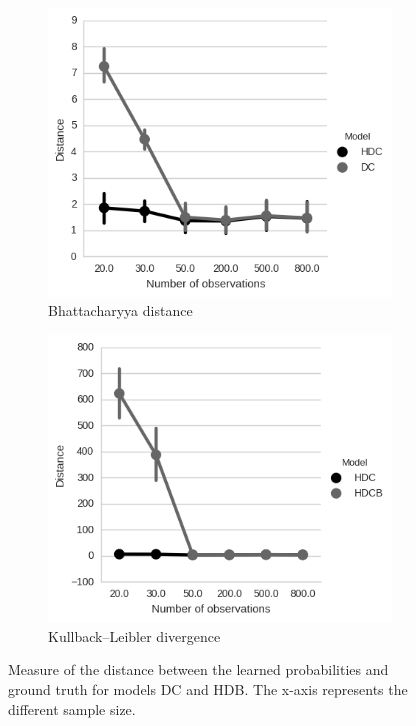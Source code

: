 \begin{figure}[htp]
\centering

\begin{subfigure}{.45\textwidth}
  \centering
  \includegraphics[width=\linewidth]{images/Eval-HDC-Bhattacharya-Distance.png}
    \caption{Bhattacharyya distance}
\end{subfigure}
\begin{subfigure}{.45\textwidth}
  \centering
  \includegraphics[width=\linewidth]{images/Eval-DC-KL-Distance.png}
    \caption{Kullback–Leibler divergence}
\end{subfigure}

\caption[DC, HDC Model Validation]{Measure of the distance between the learned probabilities and ground truth for models DC and HDB. The x-axis represents the different sample size.}
\label{fig:eval-B-KL-evaluation}
\end{figure}

